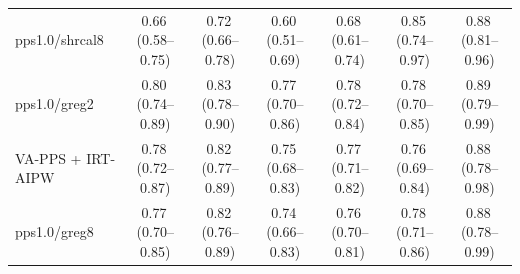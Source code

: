 \begin{tabular}{lcccccc}
pps1.0/shrcal8 & 0.66\,\scriptsize(0.58--0.75) & 0.72\,\scriptsize(0.66--0.78) & 0.60\,\scriptsize(0.51--0.69) & 0.68\,\scriptsize(0.61--0.74) & 0.85\,\scriptsize(0.74--0.97) & 0.88\,\scriptsize(0.81--0.96) \\
pps1.0/greg2 & 0.80\,\scriptsize(0.74--0.89) & 0.83\,\scriptsize(0.78--0.90) & 0.77\,\scriptsize(0.70--0.86) & 0.78\,\scriptsize(0.72--0.84) & 0.78\,\scriptsize(0.70--0.85) & 0.89\,\scriptsize(0.79--0.99) \\
VA-PPS + IRT-AIPW & 0.78\,\scriptsize(0.72--0.87) & 0.82\,\scriptsize(0.77--0.89) & 0.75\,\scriptsize(0.68--0.83) & 0.77\,\scriptsize(0.71--0.82) & 0.76\,\scriptsize(0.69--0.84) & 0.88\,\scriptsize(0.78--0.98) \\
pps1.0/greg8 & 0.77\,\scriptsize(0.70--0.85) & 0.82\,\scriptsize(0.76--0.89) & 0.74\,\scriptsize(0.66--0.83) & 0.76\,\scriptsize(0.70--0.81) & 0.78\,\scriptsize(0.71--0.86) & 0.88\,\scriptsize(0.78--0.99) \\
\bottomrule
\end{tabular}
